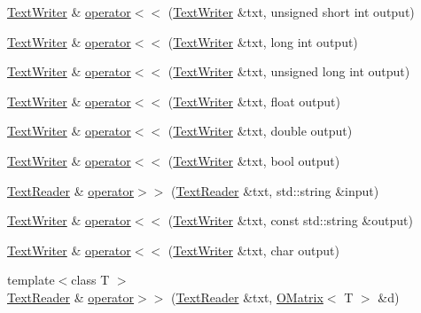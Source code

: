 \begin{DoxyCompactItemize}
\item 
\mbox{\hyperlink{classENSEM_1_1TextWriter}{Text\+Writer}} \& \mbox{\hyperlink{group__io_ga1d2f1326c7e1471ec11e3290bca05276}{operator$<$$<$}} (\mbox{\hyperlink{classENSEM_1_1TextWriter}{Text\+Writer}} \&txt, unsigned short int output)
\item 
\mbox{\hyperlink{classENSEM_1_1TextWriter}{Text\+Writer}} \& \mbox{\hyperlink{group__io_ga8d4e5827a00d9bf9fd96b669720052d1}{operator$<$$<$}} (\mbox{\hyperlink{classENSEM_1_1TextWriter}{Text\+Writer}} \&txt, long int output)
\item 
\mbox{\hyperlink{classENSEM_1_1TextWriter}{Text\+Writer}} \& \mbox{\hyperlink{group__io_gabb890a87f7dab1b0e731aaf8b8c3a681}{operator$<$$<$}} (\mbox{\hyperlink{classENSEM_1_1TextWriter}{Text\+Writer}} \&txt, unsigned long int output)
\item 
\mbox{\hyperlink{classENSEM_1_1TextWriter}{Text\+Writer}} \& \mbox{\hyperlink{group__io_ga0e07b49d2a54640fc8aa6cdeed40005a}{operator$<$$<$}} (\mbox{\hyperlink{classENSEM_1_1TextWriter}{Text\+Writer}} \&txt, float output)
\item 
\mbox{\hyperlink{classENSEM_1_1TextWriter}{Text\+Writer}} \& \mbox{\hyperlink{group__io_ga77263e95f4f5d264142cf805ef1fc01f}{operator$<$$<$}} (\mbox{\hyperlink{classENSEM_1_1TextWriter}{Text\+Writer}} \&txt, double output)
\item 
\mbox{\hyperlink{classENSEM_1_1TextWriter}{Text\+Writer}} \& \mbox{\hyperlink{group__io_ga4bb4e9f2c0da52dbce22280b6b00e35d}{operator$<$$<$}} (\mbox{\hyperlink{classENSEM_1_1TextWriter}{Text\+Writer}} \&txt, bool output)
\item 
\mbox{\hyperlink{classENSEM_1_1TextReader}{Text\+Reader}} \& \mbox{\hyperlink{group__io_ga03bd5b812dccb5e134a27e34c6e375bb}{operator$>$$>$}} (\mbox{\hyperlink{classENSEM_1_1TextReader}{Text\+Reader}} \&txt, std\+::string \&input)
\item 
\mbox{\hyperlink{classENSEM_1_1TextWriter}{Text\+Writer}} \& \mbox{\hyperlink{group__io_ga30a170c6f2ec820ececb3d3525e2ffa6}{operator$<$$<$}} (\mbox{\hyperlink{classENSEM_1_1TextWriter}{Text\+Writer}} \&txt, const std\+::string \&output)
\item 
\mbox{\hyperlink{classENSEM_1_1TextWriter}{Text\+Writer}} \& \mbox{\hyperlink{group__io_ga1d3217dcbc1fea5b302c0b53833dad39}{operator$<$$<$}} (\mbox{\hyperlink{classENSEM_1_1TextWriter}{Text\+Writer}} \&txt, char output)
\item 
{\footnotesize template$<$class T $>$ }\\\mbox{\hyperlink{classENSEM_1_1TextReader}{Text\+Reader}} \& \mbox{\hyperlink{group__obsmatrix_ga2c0b293dbb7aeff91ccffc12fdb0e858}{operator$>$$>$}} (\mbox{\hyperlink{classENSEM_1_1TextReader}{Text\+Reader}} \&txt, \mbox{\hyperlink{classENSEM_1_1OMatrix}{O\+Matrix}}$<$ T $>$ \&d)

\end{DoxyCompactItemize}
